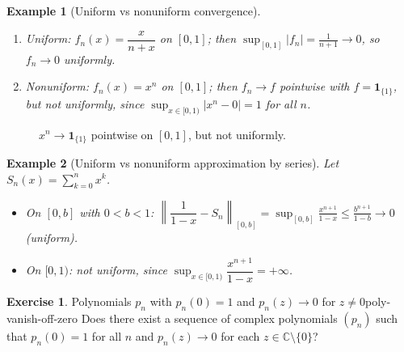 \documentclass[11pt,a4paper]{article}
\newtheorem{example}{Example}
\theoremstyle{definition}
\newtheorem{exercise}{Exercise} %
\theoremstyle{definition}
\theoremstyle{plain}
\theoremstyle{remark}
\begin{document}
\begin{example}[Uniform vs nonuniform convergence]
	\hfill
	\begin{enumerate}
		\item Uniform: $f_n(x)=\dfrac{x}{n+x}$ on $[0,1]$; then
		$\sup_{[0,1]}|f_n|=\frac{1}{n+1}\to0$, so $f_n\to0$ uniformly.
		\item Nonuniform: $f_n(x)=x^n$ on $[0,1]$; then $f_n\to f$ pointwise with
		$f=\mathbf 1_{\{1\}}$, but not uniformly, since
		$\sup_{x\in[0,1)}|x^n-0|=1$ for all $n$.
	\end{enumerate}
\end{example}

\begin{figure}[H]
	\centering
	\caption{$x^n\to \mathbf 1_{\{1\}}$ pointwise on $[0,1]$, but not uniformly.}
\end{figure}

\begin{example}[Uniform vs nonuniform approximation by series]
	Let $S_n(x)=\sum_{k=0}^{n}x^k$.
	\begin{itemize}
		\item On $[0,b]$ with $0<b<1$: $\left\|\dfrac{1}{1-x}-S_n\right\|_{[0,b]}
		=\sup_{[0,b]}\frac{x^{n+1}}{1-x}\le \frac{b^{n+1}}{1-b}\to0$ (uniform).
		\item On $[0,1)$: not uniform, since $\sup_{x\in[0,1)}\dfrac{x^{n+1}}{1-x}=+\infty$.
	\end{itemize}
\end{example}
\begin{exercise}{Polynomials $p_n$ with $p_n(0)=1$ and $p_n(z)\to0$ for $z\neq0$}{poly-vanish-off-zero}
	Does there exist a sequence of complex polynomials $(p_n)$ such that
	$p_n(0)=1$ for all $n$ and $p_n(z)\to 0$ for each $z\in\mathbb C\setminus\{0\}$?
\end{exercise}
\end{document}
